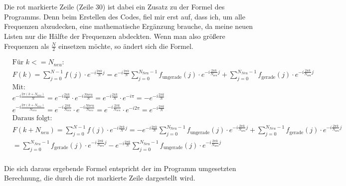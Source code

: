 \documentclass[a4paper,12pt]{article}
\theoremstyle{definition}
\theoremstyle{remark}
\begin{document}
\\\\
Die rot markierte Zeile (Zeile 30) ist dabei ein Zusatz zu der Formel des Programms. Denn beim Erstellen des Codes, 
fiel mir erst auf, dass ich, um alle Frequenzen abzudecken, eine mathematische Ergänzung brauche, da meine neuen Listen 
nur die Hälfte der Frequenzen abdeckten. Wenn man also größere Frequenzen als $\frac{N}{2}$ einsetzen möchte, so ändert 
sich die Formel. 

\begin{align*}
&\text{Für $k <= N_{neu}$:}\\
&F(k) = \sum_{j=0}^{N-1}{f(j)\cdot e^{-i \frac{2\pi k}{N} j}} = e^{-i \frac{2\pi k}{N}} \sum_{j=0}^{N_{\text{Neu}}-1}{f_{\text{ungerade}}(j)\cdot e^{-i \frac{2\pi k}{N_{\text{neu}}} j}} + \sum_{j=0}^{N_{Neu}-1}{f_{\text{gerade}}(j)\cdot e^{-i \frac{2\pi k}{N_{\text{neu}}} j}}\\
&\text{Mit: }\\
&e^{-i \frac{2\pi(k+N_{neu})}{N}} = e^{-i \frac{2\pi k}{N}} \cdot e^{-i \frac{N{neu}}{N}} = e^{-i \frac{2\pi k}{N}} \cdot e^{-i\pi} = -e^{-i \frac{2\pi k}{N}}\\
&e^{-i \frac{2\pi(k+N_{neu})}{N_{neu}}} = e^{-i \frac{2\pi k}{N_{neu}}} \cdot e^{-i \frac{N{neu}}{N_{neu}}} = e^{-i \frac{2\pi k}{N_{neu}}} \cdot e^{-i2\pi} = e^{-i  \frac{2\pi k}{N}}\\
&\text{Daraus folgt: }\\
&F(k+N_{neu}) = \sum_{j=0}^{N-1}{f(j)\cdot e^{-i \frac{2\pi k}{N} j}} = -e^{-i \frac{2\pi k}{N}} \sum_{j=0}^{N_{\text{Neu}}-1}{f_{\text{ungerade}}(j)\cdot e^{-i \frac{2\pi k}{N_{\text{neu}}} j}} + \sum_{j=0}^{N_{Neu}-1}{f_{\text{gerade}}(j)\cdot e^{-i \frac{2\pi k}{N_{\text{neu}}} j}}\\
&= \sum_{j=0}^{N_{Neu}-1}{f_{\text{gerade}}(j)\cdot e^{-i \frac{2\pi k}{N_{\text{neu}}} j}} - e^{-i \frac{2\pi k}{N}} \sum_{j=0}^{N_{\text{Neu}}-1}{f_{\text{ungerade}}(j)\cdot e^{-i \frac{2\pi k}{N_{\text{neu}}} j}} \\
\end{align*}

Die sich daraus ergebende Formel entspricht der im Programm umgesetzten Berechnung, die durch die rot markierte Zeile 
dargestellt wird.
\end{document}
